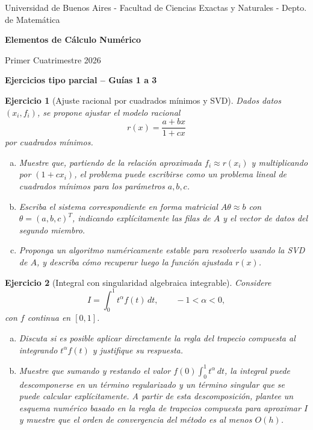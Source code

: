 \documentclass[12pt]{article}
\newtheorem{exercise}{Ejercicio}
\begin{document}
\centerline{{\small Universidad de Buenos Aires - Facultad de Ciencias Exactas y Naturales - Depto. de Matemática}}
 
 \vskip 0.2cm
 \hrulefill
 \vskip 0.2cm

 \centerline{{\bf\Huge {\sc Elementos de Cálculo Numérico}}}
 \vskip 0.2cm
 \centerline{\ttfamily Primer Cuatrimestre 2026}
 \hrulefill

 \bigskip
 \centerline{\bf Ejercicios tipo parcial -- Guías 1 a 3}
 \bigskip

\begin{exercise}[Ajuste racional por cuadrados m\'inimos y SVD]
Dados datos $(x_i,f_i)$, se propone ajustar el modelo racional
\[
r(x)=\frac{a+bx}{1+cx}
\]
por cuadrados m\'inimos.

\begin{enumerate}[(a)]
\item Muestre que, partiendo de la relaci\'on aproximada $f_i\approx r(x_i)$ y multiplicando por $(1+cx_i)$, el problema puede escribirse como un problema lineal de cuadrados m\'inimos para los par\'ametros $a,b,c$.

\item Escriba el sistema correspondiente en forma matricial $A\theta\approx b$ con $\theta=(a,b,c)^T$, indicando expl\'icitamente las filas de $A$ y el vector de datos del segundo miembro.

\item Proponga un algoritmo num\'ericamente estable para resolverlo usando la SVD de $A$, y describa c\'omo recuperar luego la funci\'on ajustada $r(x)$.
\end{enumerate}
\end{exercise}

\begin{exercise}[Integral con singularidad algebraica integrable]
Considere
\[
I=\int_0^1 t^{\alpha}f(t)\,dt, \qquad -1<\alpha<0,
\]
con $f$ continua en $[0,1]$.

\begin{enumerate}[(a)]
\item Discuta si es posible aplicar directamente la regla del trapecio compuesta al integrando $t^{\alpha}f(t)$ y justifique su respuesta.

\item Muestre que sumando y restando el valor $f(0)\int_0^1 t^{\alpha}\,dt$, la integral puede descomponerse en un término regularizado y un término singular que se puede calcular explícitamente. A partir de esta descomposición, plantee un esquema numérico basado en la regla de trapecios compuesta para aproximar $I$ y muestre que el orden de convergencia del método es al menos $O(h)$.
\end{enumerate}
\end{exercise}
\end{document}
